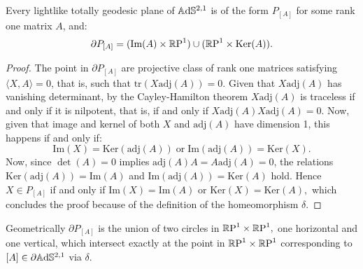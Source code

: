 \begin{lemma}\label{35}
    Every lightlike totally geodesic plane of $\A^{2,1}$ is of the form $P_{[A]}$ for some rank one matrix $A$, and: 
    \[
        \partial P_{[A]}=(\text{Im}(A)\times\S)\cup(\S\times\text{Ker}(A)).
    \]
\end{lemma}
\begin{proof}
    The point in $\partial P_{[A]}$ are projective class of rank one matrices satisfying $\langle X,A\rangle=0$, that is, such that $\text{tr}(X\text{adj}(A))=0.$ Given that $X\text{adj}(A)$ has vanishing determinant, by the Cayley-Hamilton theorem $X\text{adj}(A)$ is traceless if and only if it is nilpotent, that is, if and only if $X\text{adj}(A)X\text{adj}(A)=0.$ Now, given that image and kernel of both $X$ and $\text{adj}(A)$ have dimension 1, this happens if and only if: 
    \begin{equation}
        \text{Im}(X)=\text{Ker}(\text{adj}(A))\;\text{or}\;\text{Im}(\text{adj}(A))=\text{Ker}(X).
    \end{equation}
    Now, since $\det(A)=0$ implies $\text{adj}(A)A=A\text{adj}(A)=0$, the relations $\text{Ker}(\text{adj}(A))=\text{Im}(A)$ and $\text{Im}(\text{adj}(A))=\text{Ker}(A)$ hold. Hence $X\in P_{[A]}$ if and only if $\text{Im}(X)=\text{Im}(A)$ or $\text{Ker}(X)=\text{Ker}(A),$ which concludes the proof because of the definition of the homeomorphism $\delta$.  
\end{proof}

Geometrically $\partial P_{[A]}$ is the union of two circles in $\T,$ one horizontal and one vertical, which intersect exactly at the point in $\T$ corresponding to $[A]\in \partial\A^{2,1}$ via $\delta$.\\

